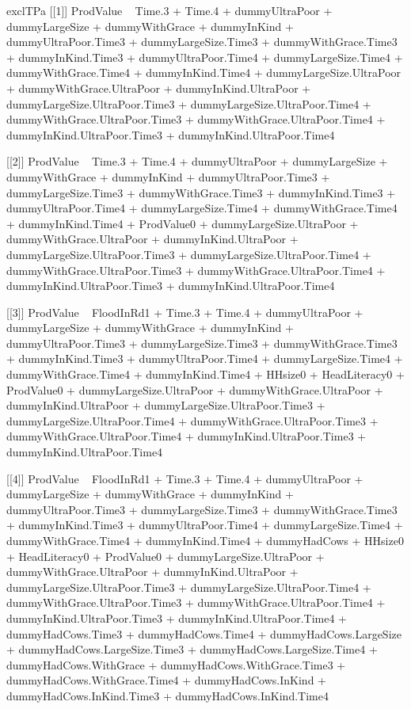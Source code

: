 \begin{Schunk}
\begin{Soutput}
[1] exclTPa
[[1]]
ProdValue ~ Time.3 + Time.4 + dummyUltraPoor + dummyLargeSize + 
    dummyWithGrace + dummyInKind + dummyUltraPoor.Time3 + dummyLargeSize.Time3 + 
    dummyWithGrace.Time3 + dummyInKind.Time3 + dummyUltraPoor.Time4 + 
    dummyLargeSize.Time4 + dummyWithGrace.Time4 + dummyInKind.Time4 + 
    dummyLargeSize.UltraPoor + dummyWithGrace.UltraPoor + dummyInKind.UltraPoor + 
    dummyLargeSize.UltraPoor.Time3 + dummyLargeSize.UltraPoor.Time4 + 
    dummyWithGrace.UltraPoor.Time3 + dummyWithGrace.UltraPoor.Time4 + 
    dummyInKind.UltraPoor.Time3 + dummyInKind.UltraPoor.Time4

[[2]]
ProdValue ~ Time.3 + Time.4 + dummyUltraPoor + dummyLargeSize + 
    dummyWithGrace + dummyInKind + dummyUltraPoor.Time3 + dummyLargeSize.Time3 + 
    dummyWithGrace.Time3 + dummyInKind.Time3 + dummyUltraPoor.Time4 + 
    dummyLargeSize.Time4 + dummyWithGrace.Time4 + dummyInKind.Time4 + 
    ProdValue0 + dummyLargeSize.UltraPoor + dummyWithGrace.UltraPoor + 
    dummyInKind.UltraPoor + dummyLargeSize.UltraPoor.Time3 + 
    dummyLargeSize.UltraPoor.Time4 + dummyWithGrace.UltraPoor.Time3 + 
    dummyWithGrace.UltraPoor.Time4 + dummyInKind.UltraPoor.Time3 + 
    dummyInKind.UltraPoor.Time4

[[3]]
ProdValue ~ FloodInRd1 + Time.3 + Time.4 + dummyUltraPoor + dummyLargeSize + 
    dummyWithGrace + dummyInKind + dummyUltraPoor.Time3 + dummyLargeSize.Time3 + 
    dummyWithGrace.Time3 + dummyInKind.Time3 + dummyUltraPoor.Time4 + 
    dummyLargeSize.Time4 + dummyWithGrace.Time4 + dummyInKind.Time4 + 
    HHsize0 + HeadLiteracy0 + ProdValue0 + dummyLargeSize.UltraPoor + 
    dummyWithGrace.UltraPoor + dummyInKind.UltraPoor + dummyLargeSize.UltraPoor.Time3 + 
    dummyLargeSize.UltraPoor.Time4 + dummyWithGrace.UltraPoor.Time3 + 
    dummyWithGrace.UltraPoor.Time4 + dummyInKind.UltraPoor.Time3 + 
    dummyInKind.UltraPoor.Time4

[[4]]
ProdValue ~ FloodInRd1 + Time.3 + Time.4 + dummyUltraPoor + dummyLargeSize + 
    dummyWithGrace + dummyInKind + dummyUltraPoor.Time3 + dummyLargeSize.Time3 + 
    dummyWithGrace.Time3 + dummyInKind.Time3 + dummyUltraPoor.Time4 + 
    dummyLargeSize.Time4 + dummyWithGrace.Time4 + dummyInKind.Time4 + 
    dummyHadCows + HHsize0 + HeadLiteracy0 + ProdValue0 + dummyLargeSize.UltraPoor + 
    dummyWithGrace.UltraPoor + dummyInKind.UltraPoor + dummyLargeSize.UltraPoor.Time3 + 
    dummyLargeSize.UltraPoor.Time4 + dummyWithGrace.UltraPoor.Time3 + 
    dummyWithGrace.UltraPoor.Time4 + dummyInKind.UltraPoor.Time3 + 
    dummyInKind.UltraPoor.Time4 + dummyHadCows.Time3 + dummyHadCows.Time4 + 
    dummyHadCows.LargeSize + dummyHadCows.LargeSize.Time3 + dummyHadCows.LargeSize.Time4 + 
    dummyHadCows.WithGrace + dummyHadCows.WithGrace.Time3 + dummyHadCows.WithGrace.Time4 + 
    dummyHadCows.InKind + dummyHadCows.InKind.Time3 + dummyHadCows.InKind.Time4


\end{Soutput}
\end{Schunk}
